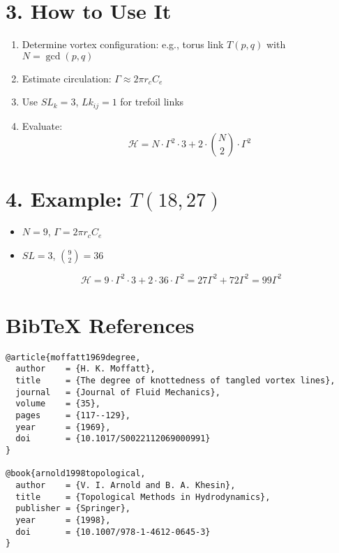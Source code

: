 \documentclass[11pt]{article}
\begin{document}
    \section*{3. How to Use It}
    \begin{enumerate}
        \item Determine vortex configuration: e.g., torus link $T(p,q)$ with $N = \gcd(p,q)$
        \item Estimate circulation: $\Gamma \approx 2\pi r_c C_e$
        \item Use $SL_k = 3$, $Lk_{ij} = 1$ for trefoil links
        \item Evaluate:
        \[ \mathcal{H} = N \cdot \Gamma^2 \cdot 3 + 2 \cdot \binom{N}{2} \cdot \Gamma^2 \]
    \end{enumerate}

    \section*{4. Example: $T(18,27)$}
    \begin{itemize}
        \item $N = 9$, $\Gamma = 2\pi r_c C_e$
        \item $SL = 3$, $\binom{9}{2} = 36$
    \end{itemize}
    \begin{equation}
        \mathcal{H} = 9 \cdot \Gamma^2 \cdot 3 + 2 \cdot 36 \cdot \Gamma^2 = 27\Gamma^2 + 72\Gamma^2 = 99\Gamma^2
    \end{equation}

    \section*{BibTeX References}
    \begin{verbatim}
@article{moffatt1969degree,
  author    = {H. K. Moffatt},
  title     = {The degree of knottedness of tangled vortex lines},
  journal   = {Journal of Fluid Mechanics},
  volume    = {35},
  pages     = {117--129},
  year      = {1969},
  doi       = {10.1017/S0022112069000991}
}

@book{arnold1998topological,
  author    = {V. I. Arnold and B. A. Khesin},
  title     = {Topological Methods in Hydrodynamics},
  publisher = {Springer},
  year      = {1998},
  doi       = {10.1007/978-1-4612-0645-3}
}
    \end{verbatim}
\end{document}
